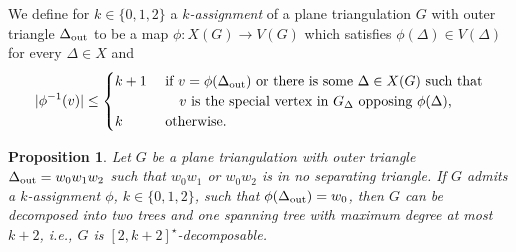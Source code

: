 \documentclass[a4paper,10pt]{article}
\theoremstyle{plain}
\newtheorem{prop}[thm]{Proposition}
\begin{document}
We define for $k \in \{0,1,2\}$ a \emph{$k$-assignment} of a plane triangulation $G$ with outer triangle $\Delta_{\rm out}$ to be a map $\phi : X(G) \to V(G)$ which satisfies $\phi(\Delta) \in V(\Delta)$ for every $\Delta \in X$ and
\[
 |\phi^{-1}(v)| \leq
  \begin{cases}
   k+1 & \text{ if $v = \phi(\Delta_{\rm out})$ or there is some $\Delta \in X(G)$ such that}\\
       & \quad \text{ $v$ is the special vertex in $G_\Delta$ opposing $\phi(\Delta)$,}\\
   k & \text{ otherwise.}
  \end{cases}
\]

\begin{prop}\label{prop:decomposition-from-assignment}
 Let $G$ be a plane triangulation with outer triangle $\Delta_{\rm out} = w_0w_1w_2$ such that $w_0w_1$ or $w_0w_2$ is in no separating triangle.
 If $G$ admits a $k$-assignment $\phi$, $k \in \{0,1,2\}$, such that $\phi(\Delta_{\rm out})=w_0$, then $G$ can be decomposed into two trees and one spanning tree with maximum degree at most $k+2$, i.e., $G$ is $[2,k+2]^\star$-decomposable.
\end{prop}
% 
\end{document}
